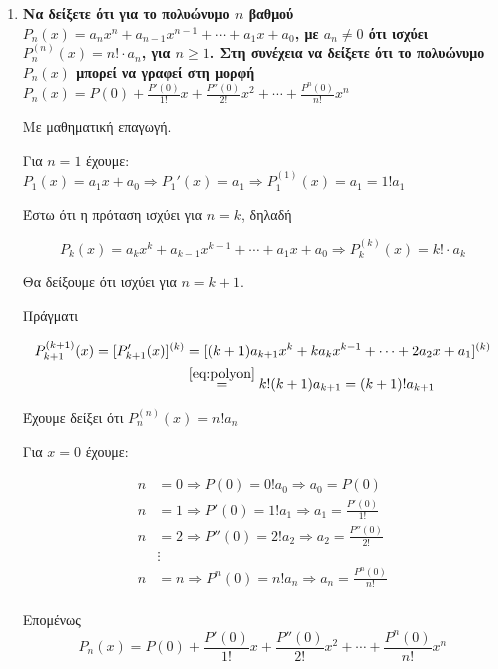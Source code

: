 \documentclass[a4paper,table]{report}
\begin{document}
\begin{enumerate}
		\item {\bfseries \boldmath Να δείξετε ότι για το πολυώνυμο $n$ βαθμού 
        $ P_{n}(x) =a_{n}x^{n} + a_{n-1}x^{n-1} + \cdots + a_{1}x + a_{0} $, 
        με  $ a_{n}\neq 0 $ ότι ισχύει $ P_{n}^{(n)}(x) = n! \cdot a_{n}$, 
        για  $n\geq 1 $. Στη συνέχεια να δείξετε ότι το πολυώνυμο $ P_{n}(x) $ 
        μπορεί να γραφεί στη μορφή $ P_{n}(x) = P(0) + \frac{P'(0)}{1!} x + 
        \frac{P''(0)}{2!} x^{2} + \cdots + \frac{P^{n}(0)}{n!} x^{n}$} 
  \begin{solution}
		Με μαθηματική επαγωγή.

		Για $ n=1 $ έχουμε: $ P_{1}(x) = a_{1}x + a_{0} \Rightarrow P_{1}'(x) =
		a_{1} \Rightarrow P_{1}^{(1)}(x)
		= a_{1} = 1!a_{1} $ 

		Έστω ότι η πρόταση ισχύει για $ n = k  $, δηλαδή

		\begin{equation}\label{eq:polyon}
			P_{k}(x) = a_{k}x^{k} + a_{k-1}x^{k-1}+ \cdots +a_{1}x + a_{0}
			\Rightarrow P_{k}^{(k)}(x) = k!\cdot a_{k}
		\end{equation}

		Θα δείξουμε ότι ισχύει για $ n = k+1 $.

		Πράγματι

		\begin{align*}
			P_{k+1}^{(k+1)}(x) = [P_{k+1}'(x)]^{(k)} 
			&= [(k+1)a_{k+1}x^{k} +	ka_{k}x^{k-1} + \cdots + 2a_{2}x + a_{1}]^{(k)} \\
			&\overset{\eqref{eq:polyon}}{=} k! (k+1) a_{k+1} = (k+1)!a_{k+1}
		\end{align*}	

		Έχουμε δείξει ότι $ P_{n}^{(n)}(x) = n! a_{n} $

		Για $ x = 0 $ έχουμε:

		\begin{align*}
			n &= 0 \Rightarrow P(0) = 0!a_{0} \Rightarrow a_{0} = P(0) \\
			n &= 1 \Rightarrow P'(0) = 1!a_{1} \Rightarrow a_{1} = \frac{P'(0)}{1!} \\ 
			n &= 2 \Rightarrow P''(0) = 2!a_{2} \Rightarrow a_{2} = \frac{P''(0)}{2!} \\
			  &\vdots \\
			n &= n \Rightarrow P^{n}(0) = n!a_{n} \Rightarrow a_{n} = \frac{P^{n}(0)}{n!} \\
		\end{align*}	

		Επομένως 
		\[
			P_{n}(x) = P(0) + \frac{P'(0)}{1!} x + \frac{P''(0)}{2!} x^{2} + \cdots
			+ \frac{P^{n}(0)}{n!} x^{n}
		\]
  \end{solution}
\end{enumerate}
    
\end{document}
